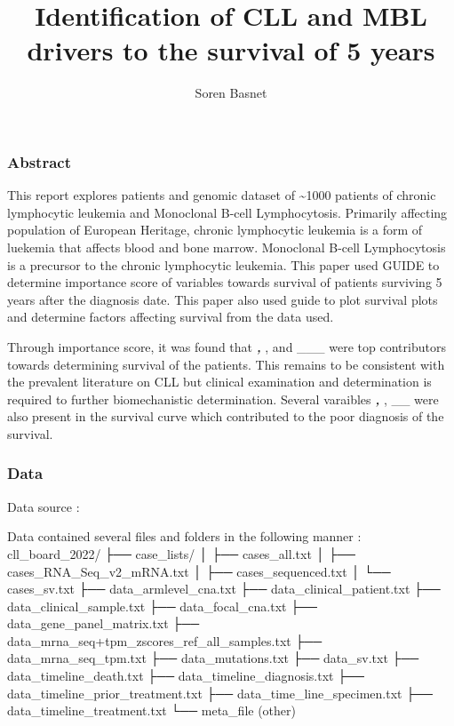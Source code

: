 \documentclass[
]{article}
\title{Identification of CLL and MBL drivers to the survival of 5 years}
\author{Soren Basnet}
\date{}
\begin{document}
\maketitle

\subsubsection{Abstract}\label{abstract}

This report explores patients and genomic dataset of \textasciitilde1000
patients of chronic lymphocytic leukemia and Monoclonal B-cell
Lymphocytosis. Primarily affecting population of European Heritage,
chronic lymphocytic leukemia is a form of luekemia that affects blood
and bone marrow. Monoclonal B-cell Lymphocytosis is a precursor to the
chronic lymphocytic leukemia. This paper used GUIDE to determine
importance score of variables towards survival of patients surviving 5
years after the diagnosis date. This paper also used guide to plot
survival plots and determine factors affecting survival from the data
used.

Through importance score, it was found that \textbf{\emph{, }}, and
\_\_\_ were top contributors towards determining survival of the
patients. This remains to be consistent with the prevalent literature on
CLL but clinical examination and determination is required to further
biomechanistic determination. Several varaibles \textbf{\emph{, }}, \_\_
were also present in the survival curve which contributed to the poor
diagnosis of the survival.

\subsubsection{Data}\label{data}

Data source :

Data contained several files and folders in the following manner :\\

cll\_board\_2022/ ├── case\_lists/ │ ├── cases\_all.txt │ ├──
cases\_RNA\_Seq\_v2\_mRNA.txt │ ├── cases\_sequenced.txt │ └──
cases\_sv.txt ├── data\_armlevel\_cna.txt ├──
data\_clinical\_patient.txt ├── data\_clinical\_sample.txt ├──
data\_focal\_cna.txt ├── data\_gene\_panel\_matrix.txt ├──
data\_mrna\_seq+tpm\_zscores\_ref\_all\_samples.txt ├──
data\_mrna\_seq\_tpm.txt ├── data\_mutations.txt ├── data\_sv.txt ├──
data\_timeline\_death.txt ├── data\_timeline\_diagnosis.txt ├──
data\_timeline\_prior\_treatment.txt ├── data\_time\_line\_specimen.txt
├── data\_timeline\_treatment.txt └── meta\_file (other)
\end{document}
